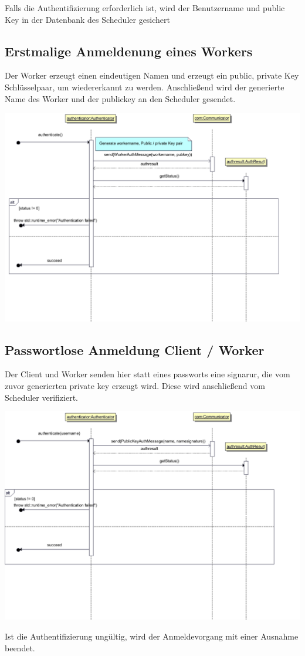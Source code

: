 \documentclass[a4paper,12pt]{article}
\begin{document}
Falls die Authentifizierung erforderlich ist, wird der Benutzername und public Key in der Datenbank des Scheduler gesichert

\clearpage

\subsection{Erstmalige Anmeldenung eines Workers}

Der Worker erzeugt einen eindeutigen Namen und erzeugt ein public, private Key Schlüsselpaar, um wiedererkannt zu werden. Anschließend wird der generierte Name des Worker und der publickey an den Scheduler gesendet.

\includegraphics[width=\textwidth]{Authenticator/WorkerAuth}

\clearpage

\subsection{Passwortlose Anmeldung Client / Worker}

Der Client und Worker senden hier statt eines passworts eine signarur, die vom zuvor generierten private key erzeugt wird. Diese wird anschließend vom Scheduler verifiziert.

\includegraphics[width=\textwidth]{Authenticator/PublicKeyAuth}

Ist die Authentifizierung ungültig, wird der Anmeldevorgang mit einer Ausnahme beendet.

\printnoidxglossaries
\end{document}
